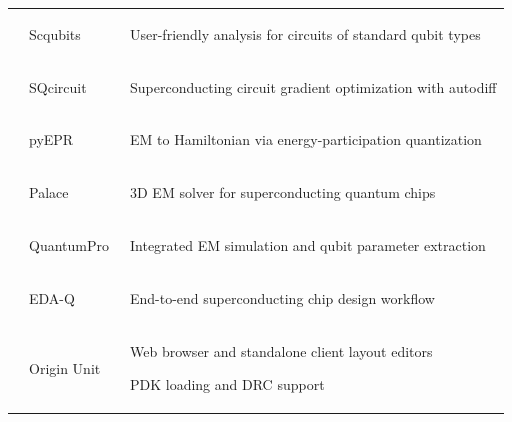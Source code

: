 \documentclass[a4paper,onecolumn,11pt,unpublished]{quantumarticle}
\begin{document}
\begin{table}[!ht]
\begin{tabular}{P{1.55cm}|P{2.6cm}|L{9.6cm}}
    & Scqubits~\cite{Groszkowski2021Scqubits, Chitta2022Computeraided}
    & \begin{tightitemize}
        \item User-friendly analysis for circuits of standard qubit types
      \end{tightitemize}
    \\ 
    
    & SQcircuit~\cite{Rajabzadeh2023Analysis}
    & \begin{tightitemize}
        \item Superconducting circuit gradient optimization with autodiff
      \end{tightitemize}
    \\ 
    
    & pyEPR~\cite{Minev2021pyEPR}
    & \begin{tightitemize}
        \item EM to Hamiltonian via energy-participation quantization
      \end{tightitemize}
    \\ 
    
    & Palace~\cite{Grimberg2023Palace}
    & \begin{tightitemize}
        \item 3D EM solver for superconducting quantum chips
      \end{tightitemize}
    \\ 
    
    & QuantumPro~\cite{QuantumPro}
    & \begin{tightitemize}
        \item Integrated EM simulation and qubit parameter extraction
      \end{tightitemize}
    \\ 
    
    & EDA-Q~\cite{Zhao2025EDAQ}
    & \begin{tightitemize}
        \item End-to-end superconducting chip design workflow
      \end{tightitemize}
    \\ 
    
    & Origin Unit~\cite{OriginUnit}
    & \begin{tightitemize}
        \item Web browser and standalone client layout editors
        \item PDK loading and DRC support
      \end{tightitemize}
    \\ 
    

\end{tabular}
\end{table}
\end{document}
